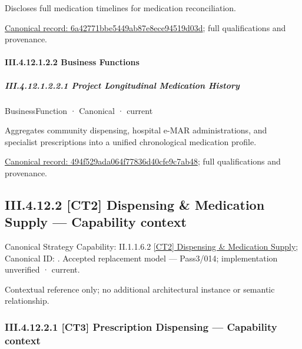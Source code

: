 Discloses full medication timelines for medication reconciliation.


{\footnotesize \href{../../../../continuum/business/business-service/6a42771bbe5449ab87e8ece94519d03d.md}{Canonical record: 6a42771bbe5449ab87e8ece94519d03d}; full qualifications and provenance.}\par
\paragraph*{III.4.12.1.2.2 Business Functions}
\label{navigation:III.4.12.1.2.2}

\subparagraph*{III.4.12.1.2.2.1 Project Longitudinal Medication History}
\label{navigation:III.4.12.1.2.2.1}

\label{element:494f529ada064f77836d40cfe9c7ab48}
{\small BusinessFunction · Canonical · current}\par

Aggregates community dispensing, hospital e-MAR administrations, and specialist prescriptions into a unified chronological medication profile.


{\footnotesize \href{../../../../continuum/business/business-function/494f529ada064f77836d40cfe9c7ab48.md}{Canonical record: 494f529ada064f77836d40cfe9c7ab48}; full qualifications and provenance.}\par
\subsection*{III.4.12.2 [CT2] Dispensing \& Medication Supply — Capability context}
\label{navigation:III.4.12.2}

{\small Canonical Strategy Capability: II.1.1.6.2 \hyperref[element:a85bdb32f6294d018e7d324cffd624d6]{[CT2] Dispensing \& Medication Supply}; Canonical ID: \texttt{}. Accepted replacement model — Pass3/014; implementation unverified · current.}\par
Contextual reference only; no additional architectural instance or semantic relationship.\par
\subsubsection*{III.4.12.2.1 [CT3] Prescription Dispensing — Capability context}
\label{navigation:III.4.12.2.1}

